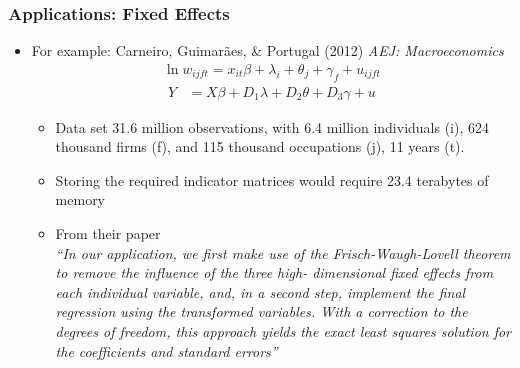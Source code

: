 \documentclass[
  shownotes,
  xcolor={svgnames},
  hyperref={colorlinks,citecolor=DarkBlue,linkcolor=DarkRed,urlcolor=DarkBlue}
  , aspectratio=169]{beamer}
\begin{document}
\begin{frame}
\frametitle{Applications: Fixed Effects}

\begin{itemize}
\item For example: Carneiro, Guimarães, \& Portugal (2012) {\it AEJ: Macroeconomics}
  \begin{align}
  \ln w_{ijft} = x_{it} \beta + \lambda_i +\theta_j +\gamma_f + u_{ijft}
  \end{align}
  \begin{align}
  Y &= X\beta + D_1 \lambda + D_2 \theta + D_3 \gamma+ u 
  \end{align}

  \begin{itemize}
    \item Data set  31.6 million observations, with 6.4 million individuals (i), 624 thousand firms (f), and 115 thousand occupations (j), 11 years (t).
    \item Storing the required indicator matrices would require 23.4 terabytes of memory
    \item From their paper  \\
    \footnotesize
    {\it ``In our application, we first make use of the Frisch-Waugh-Lovell theorem to remove the influence of the three high- dimensional fixed effects from each individual variable, and, in a second step, implement the final regression using the transformed variables. With a correction to the degrees of freedom, this approach yields the exact least squares solution for the coefficients and standard errors''}

  \end{itemize}
\end{itemize}
\end{frame}
\end{document}
